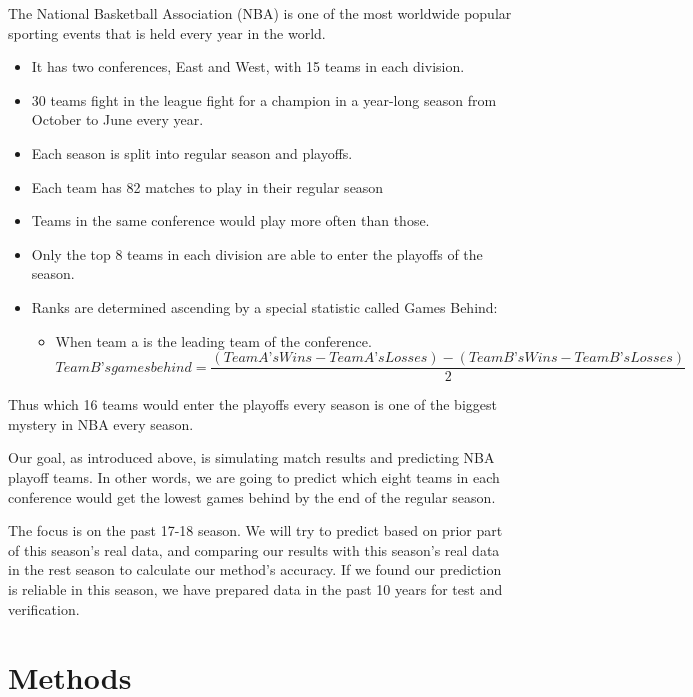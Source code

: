 \documentclass[]{article}
\providecommand{\tightlist}{%
  \setlength{\itemsep}{0pt}\setlength{\parskip}{0pt}}
\begin{document}
The National Basketball Association (NBA) is one of the most worldwide
popular sporting events that is held every year in the world.

\begin{itemize}
\tightlist
\item
  It has two conferences, East and West, with 15 teams in each division.
\item
  30 teams fight in the league fight for a champion in a year-long
  season from October to June every year.
\item
  Each season is split into regular season and playoffs.
\item
  Each team has 82 matches to play in their regular season
\item
  Teams in the same conference would play more often than those.
\item
  Only the top 8 teams in each division are able to enter the playoffs
  of the season.
\item
  Ranks are determined ascending by a special statistic called Games
  Behind:

  \begin{itemize}
  \tightlist
  \item
    When team a is the leading team of the conference.
    \[Team B’s games behind=\frac {(Team A’s Wins-Team A’s Losses)-(Team B’s Wins-Team B’s Losses)}{2}\]
  \end{itemize}
\end{itemize}

Thus which 16 teams would enter the playoffs every season is one of the
biggest mystery in NBA every season.

Our goal, as introduced above, is simulating match results and
predicting NBA playoff teams. In other words, we are going to predict
which eight teams in each conference would get the lowest games behind
by the end of the regular season.

The focus is on the past 17-18 season. We will try to predict based on
prior part of this season's real data, and comparing our results with
this season's real data in the rest season to calculate our method's
accuracy. If we found our prediction is reliable in this season, we have
prepared data in the past 10 years for test and verification.

\hypertarget{methods}{%
\section{Methods}\label{methods}}
\end{document}
